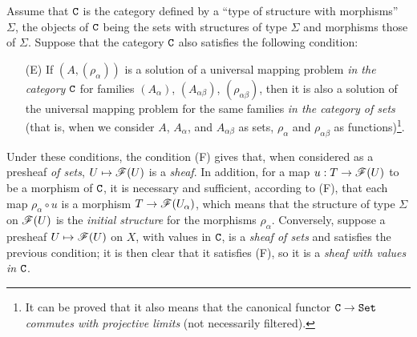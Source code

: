 \begin{env}[3.1.3]
\label{0.3.1.3}
Assume that $\mathtt{C}$ is the category defined by a
``type of structure with morphisms'' $\Sigma$, the objects of $\mathtt{C}$ being the
sets with structures of type $\Sigma$ and morphisms those of $\Sigma$. Suppose
that the category $\mathtt{C}$ also satisfies the following condition:
\begin{enumerate}
  \item[(E)] If $(A,(\rho_\alpha))$ is a solution of a universal mapping problem \emph{in the category $\mathtt{C}$} for families $(A_\alpha)$, $(A_{\alpha\beta})$,
    $(\rho_{\alpha\beta})$, then it is also a solution of the universal mapping
    problem for the same families \emph{in the category of sets} (that is, when
    we consider $A$, $A_\alpha$, and $A_{\alpha\beta}$ as sets, $\rho_\alpha$
    and $\rho_{\alpha\beta}$ as functions)\footnote{It can be proved that it
    also means that the canonical functor $\C\to\Set$ \emph{commutes with
    projective limits} (not necessarily filtered).}.
\end{enumerate}

Under these conditions, the condition (F) gives that, when considered as a
presheaf \emph{of sets}, $U\mapsto\sh{F}(U)$ is a \emph{sheaf}. In addition, for
a map $u:T\to\sh{F}(U)$ to be a morphism of $\mathtt{C}$, it is necessary and
sufficient, according to (F), that each map $\rho_\alpha\circ u$ is a morphism
$T\to\sh{F}(U_\alpha)$, which means that the structure of type $\Sigma$ on
$\mathscr{F}(U)$ is the \emph{initial structure} for the morphisms $\rho_\alpha$.
Conversely, suppose a presheaf $U\mapsto\sh{F}(U)$ on $X$, with values in $\mathtt{C}$,
is a \emph{sheaf of sets} and satisfies the previous condition; it is then clear
that it satisfies (F), so it is a \emph{sheaf with values in $\mathtt{C}$}.
\end{env}


